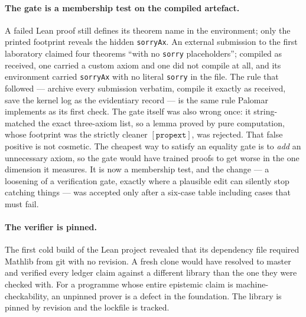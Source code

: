 \documentclass[11pt]{article}
\begin{document}
\paragraph{The gate is a membership test on the compiled artefact.} A failed Lean proof still
defines its theorem name in the environment; only the printed footprint reveals the hidden
\texttt{sorryAx}. An external submission to the first laboratory claimed four theorems ``with no
\texttt{sorry} placeholders''; compiled as received, one carried a custom axiom and one did not
compile at all, and its environment carried \texttt{sorryAx} with no literal \texttt{sorry} in
the file. The rule that followed --- archive every submission verbatim, compile it exactly as
received, save the kernel log as the evidentiary record --- is the same rule Palomar
implements as its first check. The gate itself was also wrong once: it string-matched the exact
three-axiom list, so a lemma proved by pure computation, whose footprint was the strictly
cleaner $[\texttt{propext}]$, was rejected. That false positive is not cosmetic. The cheapest
way to satisfy an equality gate is to \emph{add} an unnecessary axiom, so the gate would have
trained proofs to get worse in the one dimension it measures. It is now a membership test, and
the change --- a loosening of a verification gate, exactly where a plausible edit can silently
stop catching things --- was accepted only after a six-case table including cases that must
fail.

\paragraph{The verifier is pinned.} The first cold build of the Lean project revealed that its
dependency file required Mathlib from git with no revision. A fresh clone would have resolved to
master and verified every ledger claim against a different library than the one they were
checked with. For a programme whose entire epistemic claim is machine-checkability, an unpinned
prover is a defect in the foundation. The library is pinned by revision and the lockfile is
tracked.
\end{document}
